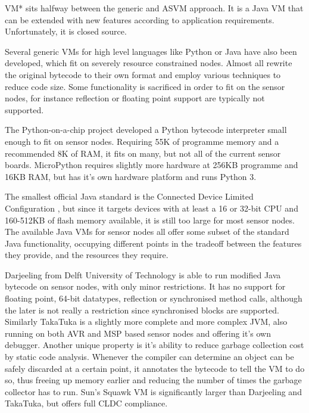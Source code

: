 VM* \cite{Koshy:2005ww} sits halfway between the generic and ASVM approach. It is a Java VM that can be extended with new features according to application requirements. Unfortunately, it is closed source.

Several generic VMs for high level languages like Python or Java have also been developed, which fit on severely resource constrained nodes. Almost all rewrite the original bytecode to their own format and employ various techniques to reduce code size. Some functionality is sacrificed in order to fit on the sensor nodes, for instance reflection or floating point support are typically not supported.

The Python-on-a-chip project \cite{python-on-a-chip} developed a Python bytecode interpreter small enough to fit on sensor nodes. Requiring 55K of programme memory and a recommended 8K of RAM, it fits on many, but not all of the current sensor boards. MicroPython \cite{micropython} requires slightly more hardware at 256KB programme and 16KB RAM, but has it's own hardware platform and runs Python 3.

The smallest official Java standard is the Connected Device Limited Configuration \cite{CLDC}, but since it targets devices with at least a 16 or 32-bit CPU and 160-512KB of flash memory available, it is still too large for most sensor nodes. The available Java VMs for sensor nodes all offer some subset of the standard Java functionality, occupying different points in the tradeoff between the features they provide, and the resources they require.

Darjeeling \cite{Brouwers:2009cj} from Delft University of Technology is able to run modified Java bytecode on sensor nodes, with only minor restrictions. It has no support for floating point, 64-bit datatypes, reflection or synchronised method calls, although the later is not really a restriction since synchronised blocks are supported. Similarly TakaTuka \cite{Aslam:2008} is a slightly more complete and more complex JVM, also running on both AVR and MSP based sensor nodes and offering it’s own debugger. Another unique property is it's ability to reduce garbage collection cost by static code analysis. Whenever the compiler can determine an object can be safely discarded at a certain point, it annotates the bytecode to tell the VM to do so, thus freeing up memory earlier and reducing the number of times the garbage collector has to run. Sun’s Squawk VM \cite{Shaylor:2003ws} is significantly larger than Darjeeling and TakaTuka, but offers full CLDC compliance.

